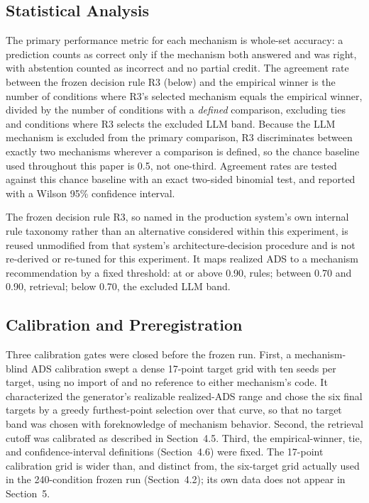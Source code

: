 \documentclass[11pt]{article}
\begin{document}
\subsection{Statistical Analysis}
\label{sec:statistical-analysis}

The primary performance metric for each mechanism is whole-set accuracy: a
prediction counts as correct only if the mechanism both answered and was
right, with abstention counted as incorrect and no partial credit. The
agreement rate between the frozen decision rule R3 (below) and the empirical
winner is the number of conditions where R3's selected mechanism equals the
empirical winner, divided by the number of conditions with a \emph{defined}
comparison, excluding ties and conditions where R3 selects the excluded
LLM band. Because the LLM mechanism is excluded from the primary comparison,
R3 discriminates between exactly two mechanisms wherever a comparison is
defined, so the chance baseline used throughout this paper is 0.5, not
one-third. Agreement rates are tested against this chance baseline with an
exact two-sided binomial test, and reported with a Wilson 95\% confidence
interval.

The frozen decision rule R3, so named in the production system's own
internal rule taxonomy rather than an alternative considered within this
experiment, is reused unmodified from that system's architecture-decision
procedure and is not re-derived or re-tuned for this experiment. It maps
realized ADS to a mechanism recommendation by a fixed threshold: at or above
0.90, rules; between 0.70 and 0.90, retrieval; below 0.70, the excluded LLM
band.

\subsection{Calibration and Preregistration}
\label{sec:calibration-prereg}

Three calibration gates were closed before the frozen run. First, a
mechanism-blind ADS calibration swept a dense 17-point target grid with ten
seeds per target, using no import of and no reference to either mechanism's
code. It characterized the generator's realizable realized-ADS range and
chose the six final targets by a greedy furthest-point selection over that
curve, so that no target band was chosen
with foreknowledge of mechanism behavior. Second, the retrieval cutoff was
calibrated as described in Section~4.5. Third, the empirical-winner, tie, and
confidence-interval definitions (Section~4.6) were fixed. The 17-point
calibration grid is wider than, and distinct from, the six-target grid
actually used in the 240-condition frozen run (Section~4.2); its own data
does not appear in Section~5.
\end{document}
